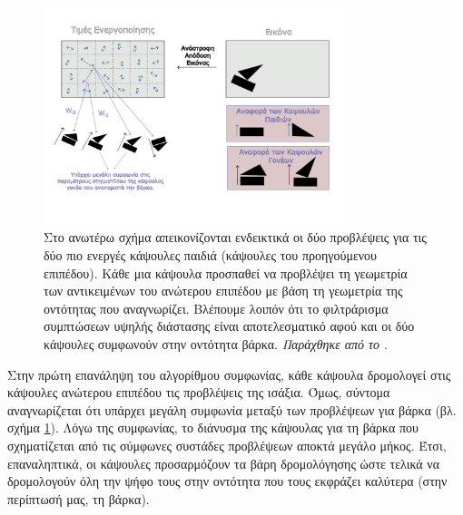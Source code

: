 \begin{figure}[p]
  \centering
  \includegraphics[width=0.8\textwidth]{images/chapter theoritical background/caps_votes_example_gr.pdf}
  \caption{Στο ανωτέρω σχήμα απεικονίζονται ενδεικτικά οι δύο προβλέψεις για τις δύο πιο ενεργές κάψουλες παιδιά (κάψουλες του προηγούμενου επιπέδου). Κάθε μια κάψουλα προσπαθεί να προβλέψει τη γεωμετρία των αντικειμένων του ανώτερου επιπέδου με βάση τη γεωμετρία της οντότητας που αναγνωρίζει. Βλέπουμε λοιπόν ότι το φιλτράρισμα συμπτώσεων υψηλής διάστασης είναι αποτελεσματικό αφού και οι δύο κάψουλες συμφωνούν στην οντότητα βάρκα. \textit{Παράχθηκε από το \href{https://inkscape.org/}{}}.}
  \label{fig:caps_votes_example}
\end{figure}

Στην πρώτη επανάληψη του αλγορίθμου συμφωνίας, κάθε κάψουλα δρομολογεί στις κάψουλες ανώτερου επιπέδου τις προβλέψεις της ισάξια. Όμως, σύντομα αναγνωρίζεται ότι υπάρχει μεγάλη συμφωνία μεταξύ των προβλέψεων για βάρκα (βλ. σχήμα \ref{fig:caps_votes_example}). Λόγω της συμφωνίας, το διάνυσμα της κάψουλας για τη βάρκα που σχηματίζεται από τις σύμφωνες συστάδες προβλέψεων αποκτά μεγάλο μήκος. Έτσι, επαναληπτικά, οι κάψουλες προσαρμόζουν τα βάρη δρομολόγησης ώστε τελικά να δρομολογούν όλη την ψήφο τους στην οντότητα που τους εκφράζει καλύτερα (στην περίπτωσή μας, τη βάρκα).



